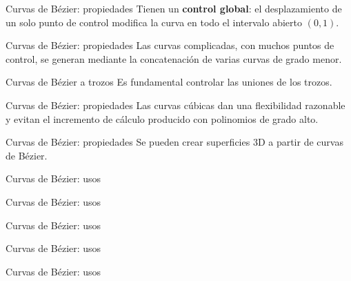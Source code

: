 \documentclass[original_version/main.tex]{subfiles}
\begin{document}
\begin{frame}[t]{Curvas de Bézier: propiedades}
Tienen un \textbf{control global}: el desplazamiento de un solo punto de control modifica la curva en todo el intervalo abierto $(0,1)$.
\end{frame}

\begin{frame}[t]{Curvas de Bézier: propiedades}
Las curvas complicadas, con muchos puntos de control, se generan mediante la concatenación de varias curvas de grado menor.
\end{frame}

\begin{frame}[t]{Curvas de Bézier a trozos}
Es fundamental controlar las uniones de los trozos.
\end{frame}

\begin{frame}[t]{Curvas de Bézier: propiedades}
Las curvas cúbicas dan una flexibilidad razonable y evitan el incremento de cálculo producido con polinomios de grado alto.
\end{frame}

\begin{frame}[t]{Curvas de Bézier: propiedades}
Se pueden crear superficies 3D a partir de curvas de Bézier.
\end{frame}

\begin{frame}[t]{Curvas de Bézier: usos}
\end{frame}

\begin{frame}[t]{Curvas de Bézier: usos}
\end{frame}

\begin{frame}[t]{Curvas de Bézier: usos}
\end{frame}

\begin{frame}[t]{Curvas de Bézier: usos}
\end{frame}

\begin{frame}[t]{Curvas de Bézier: usos}
\end{frame}
\end{document}
